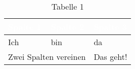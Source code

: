 \begin{table}[htbp]
     \centering
     \caption{Tabelle 1}
     \label{tab:tabelle}
     \begin{tabular}{|l|l|l|} 
         \hline
         \rowcolor{bfhblue}
         \textcolor{white}{Spalte 1} & \textcolor{white}{Spalte 2} & \textcolor{white}{Spalte 3}\\
         \hline
         Ich & bin & da \\
         \hline
         \multicolumn{2}{|l|}{Zwei Spalten vereinen} & Das geht!\\
         \hline
     \end{tabular}  
\end{table}